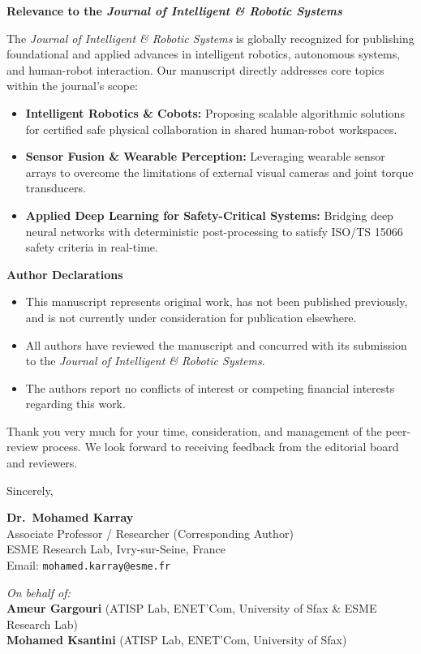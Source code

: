 \documentclass[11pt,a4paper]{article}
\begin{document}
\newpage

{\large\textbf{Relevance to the \textit{Journal of Intelligent \& Robotic Systems}}}\par\vspace{4pt}
The \textit{Journal of Intelligent \& Robotic Systems} is globally recognized for publishing foundational and applied advances in intelligent robotics, autonomous systems, and human-robot interaction. Our manuscript directly addresses core topics within the journal's scope:
\begin{itemize}[leftmargin=*,itemsep=3pt,topsep=2pt]
    \item \textbf{Intelligent Robotics \& Cobots:} Proposing scalable algorithmic solutions for certified safe physical collaboration in shared human-robot workspaces.
    \item \textbf{Sensor Fusion \& Wearable Perception:} Leveraging wearable sensor arrays to overcome the limitations of external visual cameras and joint torque transducers.
    \item \textbf{Applied Deep Learning for Safety-Critical Systems:} Bridging deep neural networks with deterministic post-processing to satisfy ISO/TS 15066 safety criteria in real-time.
\end{itemize}

\vspace{0.8em}
{\large\textbf{Author Declarations}}\par\vspace{4pt}
\begin{itemize}[leftmargin=*,itemsep=3pt,topsep=2pt]
    \item This manuscript represents original work, has not been published previously, and is not currently under consideration for publication elsewhere.
    \item All authors have reviewed the manuscript and concurred with its submission to the \textit{Journal of Intelligent \& Robotic Systems}.
    \item The authors report no conflicts of interest or competing financial interests regarding this work.
\end{itemize}

\vspace{0.8em}
Thank you very much for your time, consideration, and management of the peer-review process. We look forward to receiving feedback from the editorial board and reviewers.

\vspace{2em}

Sincerely,

\vspace{1.5em}
\textbf{Dr.\ Mohamed Karray} \\
Associate Professor / Researcher (Corresponding Author) \\
ESME Research Lab, Ivry-sur-Seine, France \\
Email: \texttt{mohamed.karray@esme.fr}

\vspace{1.2em}
\textit{On behalf of:} \\
\textbf{Ameur Gargouri} (ATISP Lab, ENET'Com, University of Sfax \& ESME Research Lab) \\
\textbf{Mohamed Ksantini} (ATISP Lab, ENET'Com, University of Sfax)
\end{document}
